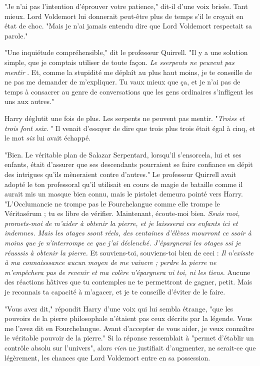 "Je n'ai pas l'intention d'éprouver votre patience," dit-il d'une voix brisée. Tant mieux. Lord Voldemort lui donnerait peut-être plus de temps s'il le croyait en état de choc. "Mais je n'ai jamais entendu dire que Lord Voldemort respectait sa parole."

"Une inquiétude compréhensible," dit le professeur Quirrell. "Il y a une solution simple, que je comptais utiliser de toute façon. \emph{Le sserpents ne peuvent pas mentir} . Et, comme la stupidité me déplaît au plus haut moins, je te conseille de ne pas me demander de m'expliquer. Tu vaux mieux que ça, et je n'ai pas de temps à consacrer au genre de conversations que les gens ordinaires s'infligent les uns aux autres."

Harry déglutit une fois de plus. Les serpents ne peuvent pas mentir. "\emph{Troiss et trois font ssix.} " Il venait d'essayer de dire que trois plus trois était égal à cinq, et le mot \emph{six}  lui avait échappé.

"Bien. Le véritable plan de Salazar Serpentard, lorsqu'il s'ensorcela, lui et ses enfants, était d'assurer que ses descendants pourraient se faire confiance en dépit des intrigues qu'ils mèneraient contre d'autres." Le professeur Quirrell avait adopté le ton professoral qu'il utilisait en cours de magie de bataille comme il aurait mis un masque bien connu, mais le pistolet demeura pointé vers Harry. "L'Occlumancie ne trompe pas le Fourchelangue comme elle trompe le Véritasérum ; tu es libre de vérifier. Maintenant, écoute-moi bien. \emph{Ssuis moi, promets-moi de m'aider à obtenir la pierre, et je laissserai ces enfants ici et indemnes. Mais les otages ssont réels, des centaines d'élèves mourront ce ssoir à moins que je n'interrompe ce que j'ai déclenché. J'épargnerai les otages ssi je réusssis à obtenir la pierre.}  Et souviens-toi, souviens-toi bien de ceci : \emph{Il n'exisste à ma connaisssance aucun moyen de me vaincre ; perdre la pierre ne m'empêchera pas de revenir et ma colère n'épargnera ni toi, ni les tiens.}  Aucune des réactions hâtives que tu contemples ne te permettront de gagner, petit. Mais je reconnais ta capacité à m'agacer, et je te conseille d'éviter de le faire.

"Vous avez dit," répondit Harry d'une voix qui lui sembla étrange, "que les pouvoirs de la pierre philosophale n'étaient pas ceux décrits par la légende. Vous me l'avez dit en Fourchelangue. Avant d'accepter de vous aider, je veux connaître le véritable pouvoir de la pierre." Si la réponse ressemblait à "permet d'établir un contrôle absolu sur l'univers", alors \emph{rien}  ne justifiait d'augmenter, ne serait-ce que légèrement, les chances que Lord Voldemort entre en sa possession.

